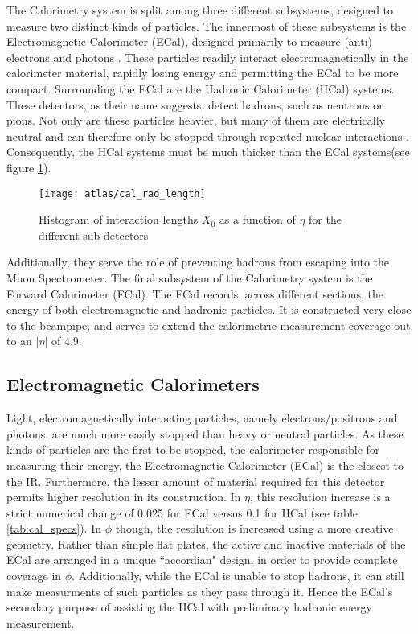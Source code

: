     The Calorimetry system is split among three different subsystems, designed to measure two distinct kinds of particles.
    The innermost of these subsystems is the Electromagnetic Calorimeter (ECal), designed primarily to measure (anti) electrons and photons \cite{calorimetry_lecture}.
    These particles readily interact electromagnetically in the calorimeter material, rapidly losing energy and permitting the ECal to be more compact.
    Surrounding the ECal are the Hadronic Calorimeter (HCal) systems.
    These detectors, as their name suggests, detect hadrons, such as neutrons or pions.
    Not only are these particles heavier, but many of them are electrically neutral and can therefore only be stopped through repeated nuclear interactions \cite{energy_measurement}.
    Consequently, the HCal systems must be much thicker than the ECal systems(see figure \ref{fig:cal_rad_length}).
    \begin{figure}
        \texttt{[image: atlas/cal\_rad\_length]}
        \caption{Histogram of interaction lengths $X_0$ as a function of $\eta$ for the different sub-detectors \cite{atlas_tdr}}
        \label{fig:cal_rad_length}
    \end{figure}
    Additionally, they serve the role of preventing hadrons from escaping into the Muon Spectrometer.
    The final subsystem of the Calorimetry system is the Forward Calorimeter (FCal).
    The FCal records, across different sections, the energy of both electromagnetic and hadronic particles.
    It is constructed very close to the beampipe, and serves to extend the calorimetric measurement coverage out to an $|\eta|$ of 4.9.

    \subsection{Electromagnetic Calorimeters}
        Light, electromagnetically interacting particles, namely electrons/positrons and photons, are much more easily stopped than heavy or neutral particles.
        As these kinds of particles are the first to be stopped, the calorimeter responsible for measuring their energy, the Electromagnetic Calorimeter (ECal) is the closest to the IR.
        Furthermore, the lesser amount of material required for this detector permits higher resolution in its construction.
        In $\eta$, this resolution increase is a strict numerical change of 0.025 for ECal versus 0.1 for HCal (see table \ref{tab:cal_specs}).
        In $\phi$ though, the resolution is increased using a more creative geometry.
        Rather than simple flat plates, the active and inactive materials of the ECal are arranged in a unique ``accordian" design, in order to provide complete coverage in $\phi$.
        Additionally, while the ECal is unable to stop hadrons, it can still make measurments of such particles as they pass through it.
        Hence the ECal's secondary purpose of assisting the HCal with preliminary hadronic energy measurement.


